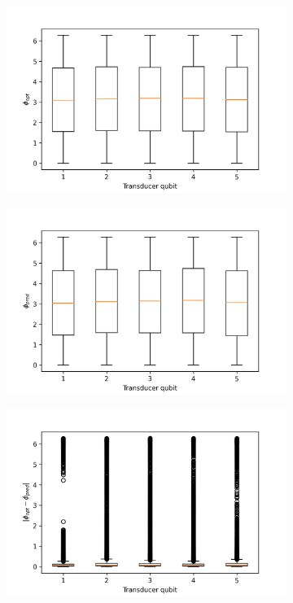 \begin{figure}
\begin{subfigure}{0.32\textwidth}
	\end{subfigure}
	\begin{subfigure}{0.32\textwidth}
		\centering
		\includegraphics[width=\textwidth]{img/phi_opt_box_dt_1}
	\end{subfigure}
	\begin{subfigure}{0.32\textwidth}
		\centering
		\includegraphics[width=\textwidth]{img/phi_pred_box_dt_1}
	\end{subfigure}
	\begin{subfigure}{0.32\textwidth}
		\centering
		\includegraphics[width=\textwidth]{img/delta_phi_box_dt_1}

\end{subfigure}
\end{figure}
